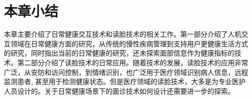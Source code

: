 


\section{本章小结}
本章主要介绍了日常健康交互技术和读脸技术的相关工作。第一部分介绍了人机交互领域在日常健康方面的研究，从传统的慢性疾病管理到支持用户更健康生活方式的研究，同时指出当前的日常健康的研究，还未探索面部信息作为健康指标的技术。第二部分介绍了读脸技术的日常应用。随着技术的发展，读脸技术的应用非常广泛，从安防和访问控制，到情绪识别，也广泛用于医疗领域识别病人信息，远程监测患者, 甚至用于检测健康状态。但是医疗领域的读脸技术，大多是为专业医护人员设计的。关于日常健康场景下的面诊技术如何设计还需要进一步的探索。